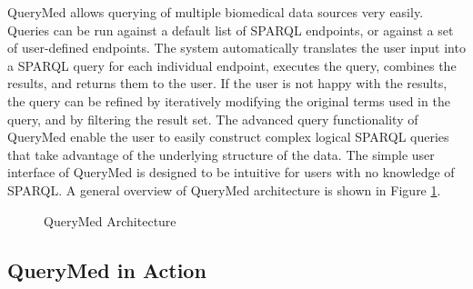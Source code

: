 \documentclass{acm_proc_article-sp}
\begin{document}
QueryMed allows querying of multiple biomedical data sources very easily.  Queries can be run against a default list of SPARQL endpoints, or against a set of user-defined endpoints. The system automatically translates the user input into a SPARQL query for each individual endpoint, executes the query, combines the results, and returns them to the user.  If the user is not happy with the results, the query can be refined  by iteratively modifying the original terms used in the query, and by filtering the result set.  The advanced query functionality of QueryMed enable the user to easily construct complex logical SPARQL queries that take advantage of the underlying structure of the data. The simple user interface of QueryMed is designed to be intuitive for users with no knowledge of SPARQL. A general overview of QueryMed architecture is shown in Figure \ref{fig:arch_details}.

\begin{figure}
\centering
{}
\caption{QueryMed Architecture}
\label{fig:arch_details}
\end{figure}

\subsection{QueryMed in Action}
\end{document}
